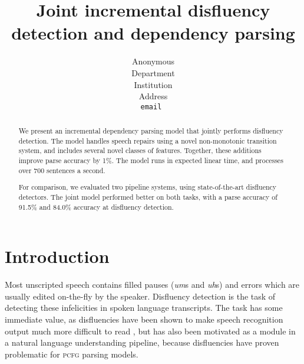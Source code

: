 \documentclass[11pt,letterpaper]{article}
\title{Joint incremental disfluency detection and dependency parsing}
\author{
	Anonymous\\
  	Department\\
  	Institution\\
  	Address\\
  {\tt \small email }\\
}
\date{}
\newcommand{\pcfg}{\textsc{pcfg}\xspace}
\begin{document}
\maketitle
\begin{abstract}

We present an incremental dependency parsing model that jointly performs
disfluency detection.  The model handles speech repairs using a novel non-monotonic
transition system, and includes several novel classes of features.  Together, these
additions improve parse accuracy by 1\%.  The model runs in expected linear time,
and processes over 700 sentences a second.

For comparison, we evaluated two pipeline systems, using state-of-the-art disfluency
detectors.  The joint model performed better on both tasks,
with a parse accuracy of 91.5\% and 84.0\% accuracy at disfluency detection.

\end{abstract}

\section{Introduction}

Most unscripted speech contains filled pauses (\emph{um}s and \emph{uh}s) and
errors which are usually edited on-the-fly by the speaker. Disfluency detection
is the task of detecting these infelicities in spoken language transcripts. The
task has some immediate value, as disfluencies have been shown to make speech
recognition output much more difficult to read \citep{jones:03}, but has also
been motivated as a module in a natural language understanding pipeline, because
disfluencies have proven problematic for \pcfg parsing models.


\end{document}

